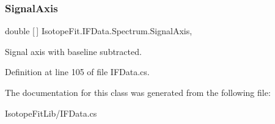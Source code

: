 \subsubsection{\texorpdfstring{Signal\+Axis}{SignalAxis}}
{\footnotesize\ttfamily double \mbox{[}$\,$\mbox{]} Isotope\+Fit.\+I\+F\+Data.\+Spectrum.\+Signal\+Axis\hspace{0.3cm}{\ttfamily [get]}, {\ttfamily [set]}}



Signal axis with baseline subtracted. 



Definition at line 105 of file I\+F\+Data.\+cs.



The documentation for this class was generated from the following file\+:\begin{DoxyCompactItemize}
\item 
Isotope\+Fit\+Lib/I\+F\+Data.\+cs\end{DoxyCompactItemize}
